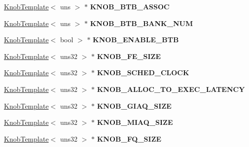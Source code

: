 \begin{DoxyCompactItemize}
\item 
\hypertarget{classall__knobs__c_abc47b44f5e88a96878f7aee8b0bb1e27}{
\hyperlink{classKnobTemplate}{KnobTemplate}$<$ uns $>$ $\ast$ {\bfseries KNOB\_\-BTB\_\-ASSOC}}
\label{classall__knobs__c_abc47b44f5e88a96878f7aee8b0bb1e27}

\item 
\hypertarget{classall__knobs__c_ab4bac7f71631adafff03e4fea6775f9f}{
\hyperlink{classKnobTemplate}{KnobTemplate}$<$ uns $>$ $\ast$ {\bfseries KNOB\_\-BTB\_\-BANK\_\-NUM}}
\label{classall__knobs__c_ab4bac7f71631adafff03e4fea6775f9f}

\item 
\hypertarget{classall__knobs__c_a0daf0109339ffd89677608933f148b0c}{
\hyperlink{classKnobTemplate}{KnobTemplate}$<$ bool $>$ $\ast$ {\bfseries KNOB\_\-ENABLE\_\-BTB}}
\label{classall__knobs__c_a0daf0109339ffd89677608933f148b0c}

\item 
\hypertarget{classall__knobs__c_acb81c1bbd00f4dc8a6f59f022450fe69}{
\hyperlink{classKnobTemplate}{KnobTemplate}$<$ uns32 $>$ $\ast$ {\bfseries KNOB\_\-FE\_\-SIZE}}
\label{classall__knobs__c_acb81c1bbd00f4dc8a6f59f022450fe69}

\item 
\hypertarget{classall__knobs__c_ad6d1a84a4f79aef5c1969d4961130638}{
\hyperlink{classKnobTemplate}{KnobTemplate}$<$ uns32 $>$ $\ast$ {\bfseries KNOB\_\-SCHED\_\-CLOCK}}
\label{classall__knobs__c_ad6d1a84a4f79aef5c1969d4961130638}

\item 
\hypertarget{classall__knobs__c_a61d6e6d75f62822dee192eaf596a2f85}{
\hyperlink{classKnobTemplate}{KnobTemplate}$<$ uns32 $>$ $\ast$ {\bfseries KNOB\_\-ALLOC\_\-TO\_\-EXEC\_\-LATENCY}}
\label{classall__knobs__c_a61d6e6d75f62822dee192eaf596a2f85}

\item 
\hypertarget{classall__knobs__c_a3d8b224a97f254c9437ead30c34372d5}{
\hyperlink{classKnobTemplate}{KnobTemplate}$<$ uns32 $>$ $\ast$ {\bfseries KNOB\_\-GIAQ\_\-SIZE}}
\label{classall__knobs__c_a3d8b224a97f254c9437ead30c34372d5}

\item 
\hypertarget{classall__knobs__c_a17e5c99b29440ee96048eb519e8fcae6}{
\hyperlink{classKnobTemplate}{KnobTemplate}$<$ uns32 $>$ $\ast$ {\bfseries KNOB\_\-MIAQ\_\-SIZE}}
\label{classall__knobs__c_a17e5c99b29440ee96048eb519e8fcae6}

\item 
\hypertarget{classall__knobs__c_ae131013083248588903b91d1f32a4a77}{
\hyperlink{classKnobTemplate}{KnobTemplate}$<$ uns32 $>$ $\ast$ {\bfseries KNOB\_\-FQ\_\-SIZE}}
\label{classall__knobs__c_ae131013083248588903b91d1f32a4a77}


\end{DoxyCompactItemize}
